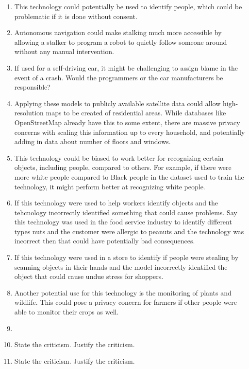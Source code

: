 \begin{enumerate}
    \item This technology could potentially be used to identify people, which could be problematic if it is done without consent.
    \item Autonomous navigation could make stalking much more accessible by allowing a stalker to program a robot to quietly follow someone around without any manual intervention.
    \item If used for a self-driving car, it might be challenging to assign blame in the event of a crash. Would the programmers or the car manufacturers be responsible?
    \item Applying these models to publicly available satellite data could allow high-resolution maps to be created of residential areas. While databases like OpenStreetMap already have this to some extent, there are massive privacy concerns with scaling this information up to every household, and potentially adding in data about number of floors and windows.
    \item This technology could be biased to work better for recognizing certain objects, including people, compared to others. For example, if there were more white people compared to Black people in the dataset used to train the technology, it might perform better at recognizing white people.
    \item If this technology were used to help workers identify objects and the tehcnology incorrectly identified something that could cause problems. Say this technology was used in the food service industry to identify different types nuts and the customer were allergic to peanuts and the technology was incorrect then that could have potentially bad consequences. 
    \item If this technology were used in a store to identify if people were stealing by scanning objects in their hands and the model incorrectly identified the object that could cause undue stress for shoppers. 
    \item Another potential use for this technology is the monitoring of plants and wildlife. This could pose a privacy concern for farmers if other people were able to monitor their crops as well. 
    \item 
    \item State the criticism. Justify the criticism.
    \item State the criticism. Justify the criticism.
\end{enumerate}


